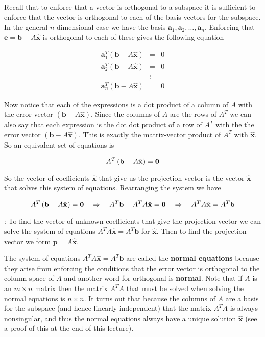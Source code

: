 \documentclass[12pt]{article}
\newcommand{\nin}{\noindent}
\newcommand{\nn}{\nonumber}
\newcommand{\vthree}{\vspace{3mm}}
\newcommand{\myp}[1]{\left( #1 \right)}
\newcommand{\beq}{\begin{eqnarray}}
\newcommand{\eeq}{\end{eqnarray}}
\newcommand{\bx}{\mathbf{x}}
\newcommand{\bp}{\mathbf{p}}
\newcommand{\ba}{\mathbf{a}}
\newcommand{\bb}{\mathbf{b}}
\newcommand{\be}{\mathbf{e}}
\begin{document}
\vthree

\nin Recall that to enforce that a vector is orthogonal to a subspace it is sufficient to enforce that the vector is orthogonal to each of the basis vectors for the subspace.  In the general $n$-dimensional case we have the basis $\ba_1, \ba_2, \ldots, \ba_n$.  Enforcing that $\be = \bb - A\hat{\bx}$ is orthogonal to each of these gives the following equation

\beq
\nn \ba_1^T\myp{\bb - A\hat{\bx}} &=& 0 \\
\nn \ba_2^T\myp{\bb - A\hat{\bx}} &=& 0 \\
\nn &\vdots& \\
\nn \ba_n^T\myp{\bb - A\hat{\bx}} &=& 0
\eeq

\vthree

\nin Now notice that each of the expressions is a dot product of a column of $A$ with the error vector $\myp{\bb - A\hat{\bx}}$.  Since the columns of $A$ are the rows of $A^T$ we can also say that each expression is the dot dot product of a row of $A^T$ with the the error vector $\myp{\bb - A\hat{\bx}}$.  This is exactly the matrix-vector product of $A^T$ with $\hat{\bx}$.  So an equivalent set of equations is

\[
A^T\myp{\bb - A\hat{\bx}} = {\bf 0}
\]

\vthree

\nin So the vector of coefficients $\hat{\bx}$ that give us the projection vector is the vector $\hat{\bx}$ that solves this system of equations.  Rearranging the system we have


\[
A^T\myp{\bb - A\hat{\bx}} = {\bf 0}
\quad \Rightarrow \quad
A^T\bb - A^TA\hat{\bx} = {\bf 0}
\quad \Rightarrow \quad
A^TA\hat{\bx} = A^T\bb
\]

\clearpage

\nin{\bf Take-Away}: To find the vector of unknown coefficients that give the projection vector we can solve the system of equations $A^TA\hat{\bx} = A^T\bb$ for $\hat{\bx}$.  Then to find the projection vector we form $\bp = A\hat{\bx}$.

\vthree

\nin The system of equations $A^TA\hat{\bx} = A^T\bb$ are called the {\bf normal equations} because they arise from enforcing the conditions that the error vector is orthogonal to the column space of $A$ and another word for orthogonal is {\bf normal}.  Note that if $A$ is an $m \times n$ matrix then the matrix $A^TA$ that must be solved when solving the normal equations is $n \times n$.  It turns out that because the columns of $A$ are a basis for the subspace (and hence linearly independent) that the matrix $A^TA$ is always nonsingular, and thus the normal equations always have a unique solution $\hat{\bx}$ (see a proof of this at the end of this lecture).
\end{document}
